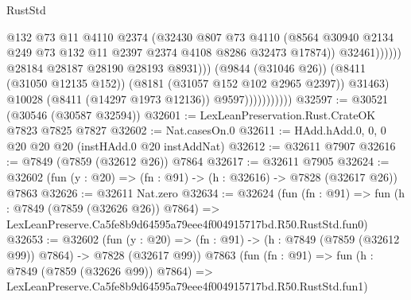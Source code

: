 \begin{lexlean}{RustStd}
\begin{coremodule}
                                              @132
                                              @73
                                              @11
                                              @4110
                                              @2374
                                              (@32430
                                                @807
                                                @73
                                                @4110
                                                (@8564
                                                  @30940
                                                  @2134
                                                  @249
                                                  @73
                                                  @132
                                                  @11
                                                  @2397
                                                  @2374
                                                  @4108
                                                  @8286
                                                  @32473
                                                  @17874))
                                              @32461))))))
                                  @28184
                                  @28187
                                  @28190
                                  @28193
                                  @8931)))
                            (@9844 (@31046 @26))
                            (@8411 (@31050 @12135 @152))
                            (@8181 (@31057 @152 @102 @2965 @2397))
                            @31463)
                          @10028
                          (@8411 (@14297 @1973 @12136))
                          @9597)))))))))))
@32597 := @30521 (@30546 (@30587 @32594))
@32601 := LexLeanPreservation.Rust.CrateOK @7823 @7825 @7827
@32602 := Nat.casesOn.{0}
@32611 := HAdd.hAdd.{0, 0, 0} @20 @20 @20 (instHAdd.{0} @20 instAddNat)
@32612 := @32611 @7907
@32616 := @7849 (@7859 (@32612 @26)) @7864
@32617 := @32611 @7905
@32624 := @32602 (fun (y : @20) => (fn : @91) -> (h : @32616) -> @7828 (@32617 @26)) @7863
@32626 := @32611 Nat.zero
@32634 := @32624
    (fun (fn : @91) =>
    fun (h : @7849 (@7859 (@32626 @26)) @7864) =>
    LexLeanPreserve.Ca5fe8b9d64595a79eee4f004915717bd.R50.RustStd.fun0)
@32653 := @32602
    (fun (y : @20) => (fn : @91) -> (h : @7849 (@7859 (@32612 @99)) @7864) -> @7828 (@32617 @99))
    @7863
    (fun (fn : @91) =>
    fun (h : @7849 (@7859 (@32626 @99)) @7864) =>
    LexLeanPreserve.Ca5fe8b9d64595a79eee4f004915717bd.R50.RustStd.fun1)

\end{coremodule}
\end{lexlean}
